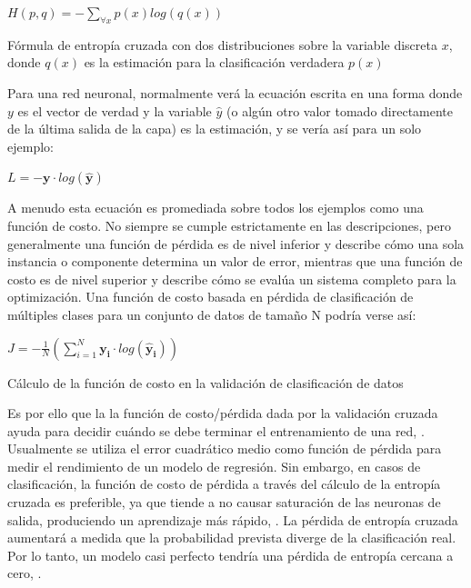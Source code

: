 			\begingroup\makeatletter{}\check@mathfonts
			\begin{center}
			$H(p,q) = -\sum_{\forall x} p(x) log(q(x))$
			\end{center}
			\begin{center}
			{\small{Fórmula de entropía cruzada con dos distribuciones sobre la variable discreta $x$, donde $q(x)$ es la estimación para la clasificación verdadera $p(x)$}}
			\end{center}
			\endgroup		

		Para una red neuronal, normalmente verá la ecuación escrita en una forma donde $y$ es el vector de verdad y la variable $\hat{y}$ (o algún otro valor tomado directamente de la última salida de la capa) es la estimación, y se vería así para un solo ejemplo:
			
			\begingroup\makeatletter{}\check@mathfonts
			\begin{center}
			$L = - \mathbf{y} \cdot log(\mathbf{\hat{y}})$
			\end{center}
			\endgroup		
		
		A menudo esta ecuación es promediada sobre todos los ejemplos como una función de costo. No siempre se cumple estrictamente en las descripciones, pero generalmente una función de pérdida es de nivel inferior y describe cómo una sola instancia o componente determina un valor de error, mientras que una función de costo es de nivel superior y describe cómo se evalúa un sistema completo para la optimización. Una función de costo basada en pérdida de clasificación de múltiples clases para un conjunto de datos de tamaño N podría verse así:
		
			\begingroup\makeatletter{}\check@mathfonts
			\begin{center}
			$J = - \frac{1}{N}(\sum_{i=1}^{N} \mathbf{y_i} \cdot log(\mathbf{\hat{y}_i}))$
			\end{center}
			\begin{center}
			{\small{Cálculo de la función de costo en la validación de clasificación de datos}}
			\end{center}
			\endgroup		
	

		Es por ello que la la función de costo/pérdida dada por la validación cruzada ayuda para decidir cuándo se debe terminar el entrenamiento de una red, \citep{AulaMLP}. Usualmente se utiliza el error cuadrático medio como función de pérdida para medir el rendimiento de un modelo de regresión. Sin embargo, en casos de clasificación, la función de costo de pérdida a través del cálculo de la entropía cruzada es preferible, ya que tiende a no causar saturación de las neuronas de salida, produciendo un aprendizaje más rápido, \citep{AulaDNN}. La pérdida de entropía cruzada aumentará a medida que la probabilidad prevista diverge de la clasificación real. Por lo tanto, un modelo casi perfecto tendría una pérdida de entropía cercana a cero, \citep{crossMSE}.
		



